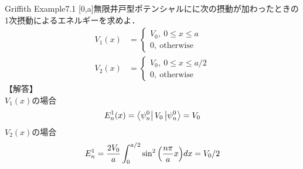\documentclass{report}
\begin{document}
  \begin{myex}{}{}Griffith Example7.1
    [0,a]無限井戸型ポテンシャルにに次の摂動が加わったときの1次摂動によるエネルギーを求めよ．
    \begin{align}
      V_1(x)&=
      \begin{cases}
      V_0,\ 0\le x\le a\\
      0,\ \mathrm{otherwise}
      \end{cases}\\
      V_2(x)&=
      \begin{cases}
      V_0,\ 0\le x \le a/2\\
      0,\ \mathrm{otherwise}
      \end{cases}
    \end{align}
    【解答】\\
    $V_1(x)$の場合
    \begin{equation}
      E_n^1(x)=\bra{\psi_n^0}V_0\ket{\psi_n^0}=V_0
    \end{equation}
    $V_2(x)$の場合
    \begin{equation}
      E_n^1=\frac{2V_0}{a}\int_{0}^{a/2}\sin^2\qty(\frac{n\pi}{a}x)dx=V_0/2
    \end{equation}
  \end{myex}
\end{document}
